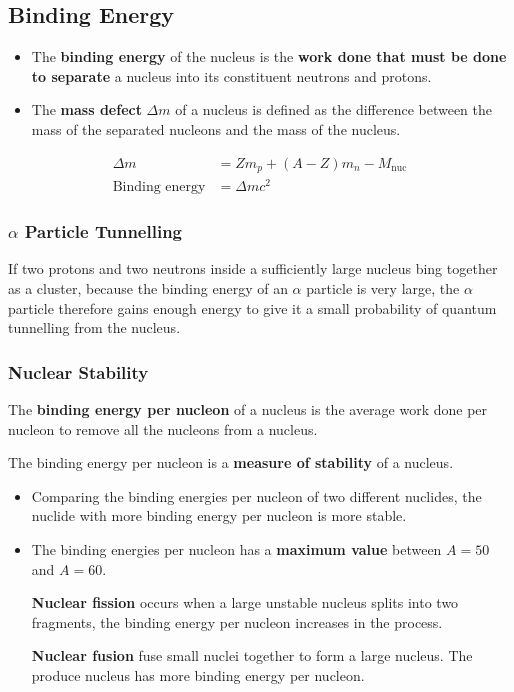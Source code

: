 \subsection{Binding Energy}

\begin{itemize}
    \item The \textbf{binding energy} of the nucleus is the \textbf{work done that must be done to separate} a nucleus into its constituent neutrons and protons.
    \item The \textbf{mass defect} $\Delta m$ of a nucleus is defined as the difference between the mass of the separated nucleons and the mass of the nucleus.
\end{itemize}
\begin{align*}
    \Delta m&=Zm_p+(A-Z)m_n-M_\text{nuc}\\
    \text{Binding energy}&=\Delta mc^2
\end{align*}

\subsubsection*{$\alpha$ Particle Tunnelling}

If two protons and two neutrons inside a sufficiently large nucleus bing together as a cluster, because the binding energy of an $\alpha$ particle is very large, the $\alpha$ particle therefore gains enough energy to give it a small probability of quantum tunnelling from the nucleus.

\subsubsection*{Nuclear Stability}

The \textbf{binding energy per nucleon} of a nucleus is the average work done per nucleon to remove all the nucleons from a nucleus.

The binding energy per nucleon is a \textbf{measure of stability} of a nucleus.
\begin{itemize}
    \item Comparing the binding energies per nucleon of two different nuclides, the nuclide with more binding energy per nucleon is more stable.
    \item The binding energies per nucleon has a \textbf{maximum value} between $A=50$ and $A=60$.

        \textbf{Nuclear fission} occurs when a large unstable nucleus splits into two fragments, the binding energy per nucleon increases in the process.
        
        \textbf{Nuclear fusion} fuse small nuclei together to form a large nucleus. The produce nucleus has more binding energy per nucleon.
\end{itemize}
